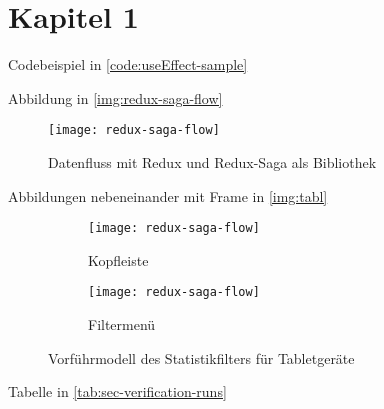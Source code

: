 \section{Kapitel 1}
Codebeispiel in \autoref{code:useEffect-sample}



Abbildung in \autoref{img:redux-saga-flow}

\begin{figure}[H]
	\centering
	\texttt{[image: redux-saga-flow]}
	\caption{Datenfluss mit Redux und Redux-Saga als Bibliothek}
	\label{img:redux-saga-flow}
\end{figure}

Abbildungen nebeneinander mit Frame in \autoref{img:tabl}

\begin{figure}[H]
	\centering
	\begin{subfigure}[b]{.45\textwidth}
		\centering
		\texttt{[image: redux-saga-flow]}
		\caption{Kopfleiste}
		\label{img:tablet-head}
	\end{subfigure}
	\begin{subfigure}[b]{.45\textwidth}
		\centering
		\texttt{[image: redux-saga-flow]}
		\caption{Filtermenü}
		\label{img:tablet}
	\end{subfigure}
	\caption{Vorführmodell des Statistikfilters für Tabletgeräte}
	\label{img:tabl}
\end{figure}

Tabelle in \autoref{tab:sec-verification-runs}

